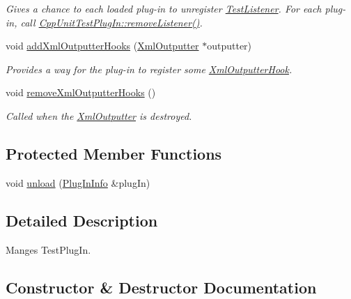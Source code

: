 \begin{DoxyCompactItemize}
\begin{DoxyCompactList}\small\item\em Gives a chance to each loaded plug-\/in to unregister \hyperlink{class_test_listener}{Test\+Listener}. For each plug-\/in, call \hyperlink{struct_cpp_unit_test_plug_in_a8f36157014b515d38efbc8ab67923d85}{Cpp\+Unit\+Test\+Plug\+In\+::remove\+Listener()}. \end{DoxyCompactList}\item 
void \hyperlink{class_plug_in_manager_a4a9c64e0ac3f762b100b993d7e33f889}{add\+Xml\+Outputter\+Hooks} (\hyperlink{class_xml_outputter}{Xml\+Outputter} $\ast$outputter)\hypertarget{class_plug_in_manager_a4a9c64e0ac3f762b100b993d7e33f889}{}\label{class_plug_in_manager_a4a9c64e0ac3f762b100b993d7e33f889}

\begin{DoxyCompactList}\small\item\em Provides a way for the plug-\/in to register some \hyperlink{class_xml_outputter_hook}{Xml\+Outputter\+Hook}. \end{DoxyCompactList}\item 
void \hyperlink{class_plug_in_manager_a0fe59f82fd430ea57159a6ffad9a4035}{remove\+Xml\+Outputter\+Hooks} ()
\begin{DoxyCompactList}\small\item\em Called when the \hyperlink{class_xml_outputter}{Xml\+Outputter} is destroyed. \end{DoxyCompactList}\end{DoxyCompactItemize}
\subsection*{Protected Member Functions}
\begin{DoxyCompactItemize}
\item 
void \hyperlink{class_plug_in_manager_afc1fa045afaac73cd44f69839056f1e1}{unload} (\hyperlink{struct_plug_in_manager_1_1_plug_in_info}{Plug\+In\+Info} \&plug\+In)
\end{DoxyCompactItemize}


\subsection{Detailed Description}
Manges Test\+Plug\+In. 

\subsection{Constructor \& Destructor Documentation}
